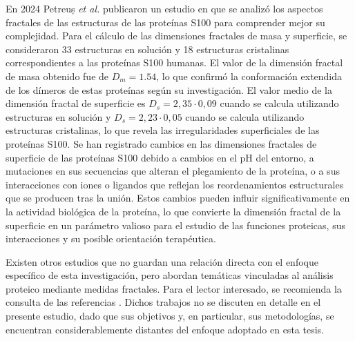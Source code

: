 En 2024 Petreuș \textit{et al.} publicaron un estudio en que se analiz\'{o} los aspectos fractales de las estructuras de las prote\'{i}nas S100 para comprender mejor su complejidad. Para el c\'{a}lculo de las dimensiones fractales de masa y superficie, se consideraron 33 estructuras en soluci\'{o}n y 18 estructuras cristalinas correspondientes a las prote\'{i}nas S100 humanas. El valor de la dimensi\'{o}n fractal de masa obtenido fue de $D_m = 1.54$, lo que confirm\'{o} la conformaci\'{o}n extendida de los d\'{i}meros de estas prote\'{i}nas seg\'{u}n su investigaci\'{o}n. El valor medio de la dimensi\'{o}n fractal de superficie es $D_s = 2,35 \cdot 0,09 $ cuando se calcula utilizando estructuras en soluci\'{o}n y $D_s = 2,23 \cdot 0,05$ cuando se calcula utilizando estructuras cristalinas, lo que revela las irregularidades superficiales de las prote\'{i}nas S100. Se han registrado cambios en las dimensiones fractales de superficie de las prote\'{i}nas S100 debido a cambios en el pH del entorno, a mutaciones en sus secuencias que alteran el plegamiento de la prote\'{i}na, o a sus interacciones con iones o ligandos que reflejan los reordenamientos estructurales que se producen tras la uni\'{o}n. Estos cambios pueden influir significativamente en la actividad biol\'{o}gica de la prote\'{i}na, lo que convierte la dimensi\'{o}n fractal de la superficie en un par\'{a}metro valioso para el estudio de las funciones proteicas, sus interacciones y su posible orientaci\'{o}n terap\'{e}utica. 

Existen otros estudios que no guardan una relaci\'{o}n directa con el enfoque espec\'{i}fico de esta investigaci\'{o}n, pero abordan tem\'{a}ticas vinculadas al an\'{a}lisis proteico mediante medidas fractales. Para el lector interesado, se recomienda la consulta de las referencias \cite{Shen2001, Banerji2013, Sendker2024}. Dichos trabajos no se discuten en detalle en el presente estudio, dado que sus objetivos y, en particular, sus metodolog\'{i}as, se encuentran considerablemente distantes del enfoque adoptado en esta tesis.

\color{black}